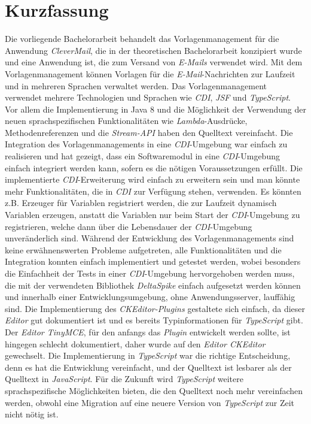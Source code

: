 \chapter{Kurzfassung}
Die vorliegende Bachelorarbeit behandelt das Vorlagenmanagement für die Anwendung \emph{CleverMail}, die in der theoretischen Bachelorarbeit konzipiert wurde und eine Anwendung ist, die zum Versand von \emph{E-Mails} verwendet wird. Mit dem Vorlagenmanagement können Vorlagen für die \emph{E-Mail}-Nachrichten zur Laufzeit und in mehreren Sprachen verwaltet werden.
\newline
\newline
Das Vorlagenmanagement verwendet mehrere Technologien und Sprachen wie \emph{CDI}, \emph{JSF} und \emph{TypeScript}. Vor allem die Implementierung in Java 8 und die Möglichkeit der Verwendung der neuen sprachspezifischen Funktionalitäten wie \emph{Lambda}-Ausdrücke, Methodenreferenzen und die \emph{Stream-API} haben den Quelltext vereinfacht.
\newline
\newline
Die Integration des Vorlagenmanagements in eine \emph{CDI}-Umgebung war einfach zu realisieren und hat gezeigt, dass ein Softwaremodul in eine \emph{CDI}-Umgebung einfach integriert werden kann, sofern es die nötigen Voraussetzungen erfüllt. Die implementierte \emph{CDI}-Erweiterung wird einfach zu erweitern sein und man könnte mehr Funktionalitäten, die in \emph{CDI} zur Verfügung stehen, verwenden. Es könnten z.B. Erzeuger für Variablen registriert werden, die zur Laufzeit dynamisch Variablen erzeugen, anstatt die Variablen nur beim Start der \emph{CDI}-Umgebung zu registrieren, welche dann über die Lebensdauer der \emph{CDI}-Umgebung  unveränderlich sind. 
\newline
\newline
Während der Entwicklung des Vorlagenmanagements sind keine erwähnenswerten Probleme aufgetreten, alle Funktionalitäten und die Integration konnten einfach implementiert und getestet werden, wobei besonders die Einfachheit der Tests in einer \emph{CDI}-Umgebung hervorgehoben werden muss, die mit der verwendeten Bibliothek \emph{DeltaSpike} einfach aufgesetzt werden können und innerhalb einer Entwicklungsumgebung, ohne Anwendungsserver, lauffähig sind.
\newline
\newline
Die Implementierung des \emph{CKEditor-Plugins} gestaltete sich einfach, da dieser \emph{Editor} gut dokumentiert ist und es bereits Typinformationen für \emph{TypeScript} gibt. Der \emph{Editor TinyMCE}, für den anfangs das \emph{Plugin} entwickelt werden sollte, ist hingegen schlecht dokumentiert, daher wurde auf den \emph{Editor CKEditor} gewechselt. Die Implementierung in \emph{TypeScript} war die richtige Entscheidung, denn es hat die Entwicklung vereinfacht, und der Quelltext ist lesbarer als der Quelltext in \emph{JavaScript}. Für die Zukunft wird \emph{TypeScript} weitere sprachspezifische Möglichkeiten bieten, die den Quelltext noch mehr vereinfachen werden, obwohl eine Migration auf eine neuere Version von \emph{TypeScript} zur Zeit nicht nötig ist.
